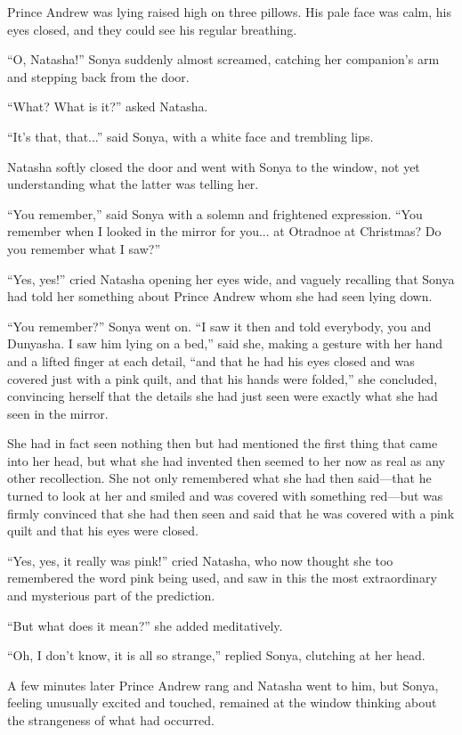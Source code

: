 Prince Andrew was lying raised high on three pillows. His pale
face was calm, his eyes closed, and they could see his regular
breathing.

``O, Natasha!'' Sonya suddenly almost screamed, catching her
companion's arm and stepping back from the door.

``What? What is it?'' asked Natasha.

``It's that, that...'' said Sonya, with a white face and
trembling lips.

Natasha softly closed the door and went with Sonya to the window,
not yet understanding what the latter was telling her.

``You remember,'' said Sonya with a solemn and frightened
expression. ``You remember when I looked in the mirror for
you... at Otradnoe at Christmas? Do you remember what I saw?''

``Yes, yes!'' cried Natasha opening her eyes wide, and vaguely
recalling that Sonya had told her something about Prince Andrew
whom she had seen lying down.

``You remember?'' Sonya went on. ``I saw it then and told
everybody, you and Dunyasha. I saw him lying on a bed,'' said
she, making a gesture with her hand and a lifted finger at each
detail, ``and that he had his eyes closed and was covered just
with a pink quilt, and that his hands were folded,'' she
concluded, convincing herself that the details she had just seen
were exactly what she had seen in the mirror.

She had in fact seen nothing then but had mentioned the first
thing that came into her head, but what she had invented then
seemed to her now as real as any other recollection. She not only
remembered what she had then said---that he turned to look at her
and smiled and was covered with something red---but was firmly
convinced that she had then seen and said that he was covered
with a pink quilt and that his eyes were closed.

``Yes, yes, it really was pink!'' cried Natasha, who now thought
she too remembered the word pink being used, and saw in this the
most extraordinary and mysterious part of the prediction.

``But what does it mean?'' she added meditatively.

``Oh, I don't know, it is all so strange,'' replied Sonya,
clutching at her head.

A few minutes later Prince Andrew rang and Natasha went to him,
but Sonya, feeling unusually excited and touched, remained at the
window thinking about the strangeness of what had occurred.

